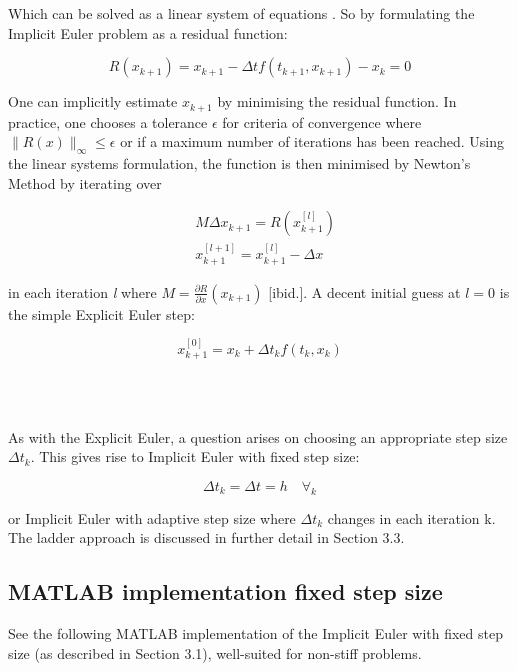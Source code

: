 Which can be solved as a linear system of equations \cite{JrgensenScientificEquationsb}. So by formulating the Implicit Euler problem as a residual function: 

\begin{equation}
R\left(x_{k+1}\right)=x_{k+1}-\Delta t f\left(t_{k+1}, x_{k+1}\right)-x_{k}=0
\end{equation}

One can implicitly estimate $x_{k+1}$ by minimising the residual function. In practice, one chooses a tolerance $\epsilon$ for criteria of convergence where $\|R(x)\|_{\infty} \leq \epsilon$ or if a maximum number of iterations has been reached. Using the linear systems formulation, the function is then minimised by Newton's Method by iterating over

$$
\begin{aligned}
&M \Delta x_{k+1}=R\left(x_{k+1}^{[l]}\right) \\
&x_{k+1}^{[l+1]}=x_{k+1}^{[l]}-\Delta x
\end{aligned}
$$

in each iteration \textit{l} where $M=\frac{\partial R}{\partial x}\left(x_{k+1}\right)$ [ibid.]. A decent initial guess at $l=0$ is the simple Explicit Euler step:

$$
x_{k+1}^{[0]}=x_{k}+\Delta t_k f\left(t_{k}, x_{k}\right)
$$

\\\

As with the Explicit Euler, a question arises on choosing an appropriate step size $\Delta t_k$. This gives rise to Implicit Euler with fixed step size:

\begin{equation*}
    \Delta t_k = \Delta t = h \quad \forall_k
\end{equation*}

or Implicit Euler with adaptive step size where $\Delta t_k$ changes in each iteration k. The ladder approach is discussed in further detail in Section 3.3.













\subsection{MATLAB implementation fixed step size}
See the following MATLAB implementation of the Implicit Euler with fixed step size (as described in Section 3.1), well-suited for non-stiff problems.

